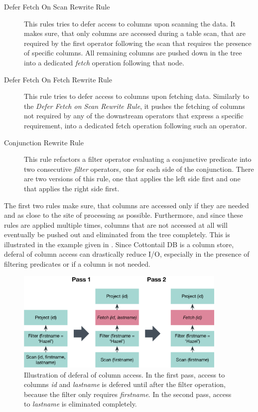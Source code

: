 \begin{description}
    \item[Defer Fetch On Scan Rewrite Rule] This rules tries to defer access to columns upon scanning the data. It makes sure, that only columns are accessed during a table scan, that are required by the first operator following the scan that requires the presence of specific columns. All remaining columns are pushed down in the tree into a dedicated \emph{fetch} operation following that node.
 
    \item[Defer Fetch On Fetch Rewrite Rule] This rule tries to defer access to columns upon fetching data. Similarly to the \emph{Defer Fetch on Scan Rewrite Rule}, it pushes the fetching of columns not required by any of the downstream operators that express a specific requirement, into a dedicated fetch operation following such an operator.
    
    \item[Conjunction Rewrite Rule] This rule refactors a filter operator evaluating a conjunctive predicate into two consecutive \emph{filter} operators, one for each side of the conjunction. There are two versions of this rule, one that applies the left side first and one that applies the right side first.
\end{description}

The first two rules make sure, that columns are accessed only if they are needed and as close to the site of processing as possible. Furthermore, and since these rules are applied multiple times, columns that are not accessed at all will eventually be pushed out and eliminated from the tree completely. This is illustrated in the example given in . Since Cottontail DB is a column store, deferal of column access can drastically reduce I/O, especially in the presence of filtering predicates or if a column is not needed. 

\begin{figure}[bt]
    \centering
    \includegraphics[width=0.9\textwidth]{figures/logical-rule-fetch}
    \caption{Illustration of deferal of column access. In the first pass, access to columns \emph{id} and \emph{lastname} is defered until after the filter operation, because the filter only requires \emph{firstname}. In the second pass, access to \emph{lastname} is eliminated completely.}
    \label{figure:cottontail_logical_rule_fetch}
\end{figure}

